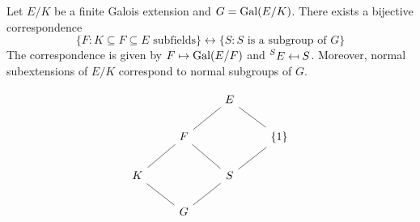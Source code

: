 \chapter{}




\begin{theorem}[Galois]
    Let $E/K$ be a finite Galois extension and $G=\operatorname{Gal}(E/K)$. 
    There exists a bijective correspondence
    \[
    \{F:K\subseteq F\subseteq E\text{ subfields}\}\leftrightarrow
    \{S:S\text{ is a subgroup of $G$}\}
    \]
    The correspondence is given by $F\mapsto \operatorname{Gal}(E/F)$ and 
    $\prescript{S}{}{E}\mapsfrom S$. Moreover, 
    normal subextensions of $E/K$ correspond 
    to normal subgroups of $G$. 
\end{theorem}

\[
\begin{tikzcd}
	&& E \\
	& F && {\{1\}} \\
	K && S \\
	& G
	\arrow[no head, from=1-3, to=2-2]
	\arrow[no head, from=2-2, to=3-1]
	\arrow[no head, from=3-1, to=4-2]
	\arrow[no head, from=4-2, to=3-3]
	\arrow[no head, from=2-2, to=3-3]
	\arrow[no head, from=1-3, to=2-4]
	\arrow[no head, from=2-4, to=3-3]
\end{tikzcd}
\]

